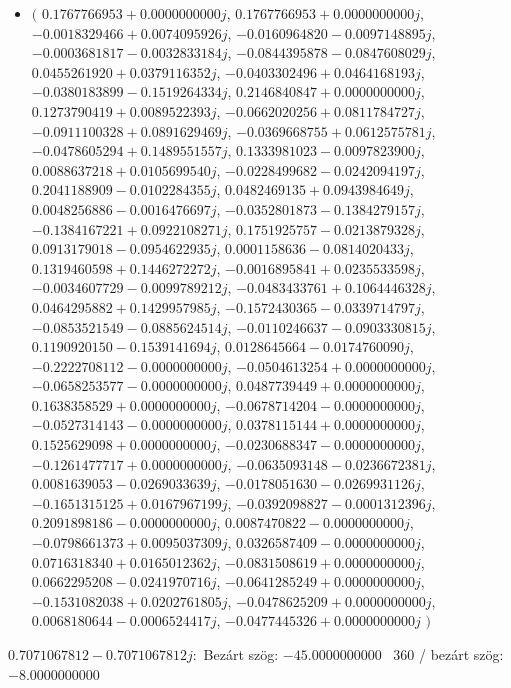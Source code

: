 \documentclass[14pt,a4paper]{article}
\begin{document}
\begin{itemize}
\item
$\big($
$0.1767766953+0.0000000000j$, $0.1767766953+0.0000000000j$, $-0.0018329466+0.0074095926j$, $-0.0160964820-0.0097148895j$, $-0.0003681817-0.0032833184j$, $-0.0844395878-0.0847608029j$, $0.0455261920+0.0379116352j$, $-0.0403302496+0.0464168193j$, $-0.0380183899-0.1519264334j$, $0.2146840847+0.0000000000j$, $0.1273790419+0.0089522393j$, $-0.0662020256+0.0811784727j$, $-0.0911100328+0.0891629469j$, $-0.0369668755+0.0612575781j$, $-0.0478605294+0.1489551557j$, $0.1333981023-0.0097823900j$, $0.0088637218+0.0105699540j$, $-0.0228499682-0.0242094197j$, $0.2041188909-0.0102284355j$, $0.0482469135+0.0943984649j$, $0.0048256886-0.0016476697j$, $-0.0352801873-0.1384279157j$, $-0.1384167221+0.0922108271j$, $0.1751925757-0.0213879328j$, $0.0913179018-0.0954622935j$, $0.0001158636-0.0814020433j$, $0.1319460598+0.1446272272j$, $-0.0016895841+0.0235533598j$, $-0.0034607729-0.0099789212j$, $-0.0483433761+0.1064446328j$, $0.0464295882+0.1429957985j$, $-0.1572430365-0.0339714797j$, $-0.0853521549-0.0885624514j$, $-0.0110246637-0.0903330815j$, $0.1190920150-0.1539141694j$, $0.0128645664-0.0174760090j$, $-0.2222708112-0.0000000000j$, $-0.0504613254+0.0000000000j$, $-0.0658253577-0.0000000000j$, $0.0487739449+0.0000000000j$, $0.1638358529+0.0000000000j$, $-0.0678714204-0.0000000000j$, $-0.0527314143-0.0000000000j$, $0.0378115144+0.0000000000j$, $0.1525629098+0.0000000000j$, $-0.0230688347-0.0000000000j$, $-0.1261477717+0.0000000000j$, $-0.0635093148-0.0236672381j$, $0.0081639053-0.0269033639j$, $-0.0178051630-0.0269931126j$, $-0.1651315125+0.0167967199j$, $-0.0392098827-0.0001312396j$, $0.2091898186-0.0000000000j$, $0.0087470822-0.0000000000j$, $-0.0798661373+0.0095037309j$, $0.0326587409-0.0000000000j$, $0.0716318340+0.0165012362j$, $-0.0831508619+0.0000000000j$, $0.0662295208-0.0241970716j$, $-0.0641285249+0.0000000000j$, $-0.1531082038+0.0202761805j$, $-0.0478625209+0.0000000000j$, $0.0068180644-0.0006524417j$, $-0.0477445326+0.0000000000j$
$\big)$
\end{itemize}
$0.7071067812-0.7071067812j$:\
Bezárt szög: $-45.0000000000$ \
360 / bezárt szög: $-8.0000000000$\
\end{document}
